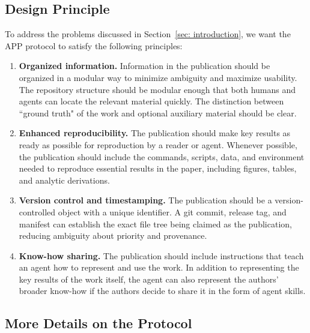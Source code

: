 \documentclass{article}
\begin{document}
\subsection{Design Principle}

To address the problems discussed in Section~\ref{sec: introduction}, we want the APP protocol to satisfy the following principles:

\begin{enumerate}
    \item \textbf{Organized information.} Information in the publication should be organized in a modular way to minimize ambiguity and maximize usability. The repository structure
          should be modular enough that both humans and agents can locate the relevant
          material quickly. The distinction between ``ground truth" of the work and optional auxiliary material should be clear.

    \item \textbf{Enhanced reproducibility.}
          The publication should make key results as ready as possible for reproduction
          by a reader or agent. Whenever possible, the publication should include the commands, scripts,
          data, and environment needed to reproduce essential results in the paper, including figures, tables, and analytic derivations.

    \item \textbf{Version control and timestamping.}
          The publication should be a version-controlled object with a unique identifier.
          A git commit, release tag, and manifest can establish the exact file tree being
          claimed as the publication, reducing ambiguity about priority and provenance.

    \item \textbf{Know-how sharing.}
          The publication should include instructions that teach an agent how to represent
          and use the work. In addition to representing the key results of the work itself, the agent can also represent the authors' broader know-how if the authors decide to share it in the form of agent skills.
\end{enumerate}

\subsection{More Details on the Protocol}
\end{document}
